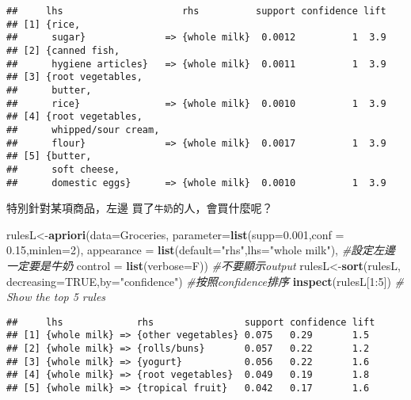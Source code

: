 \documentclass[]{book}
\newenvironment{Shaded}{\begin{snugshade}}{\end{snugshade}}
\newcommand{\KeywordTok}[1]{\textcolor[rgb]{0.13,0.29,0.53}{\textbf{{#1}}}}
\newcommand{\DataTypeTok}[1]{\textcolor[rgb]{0.13,0.29,0.53}{{#1}}}
\newcommand{\DecValTok}[1]{\textcolor[rgb]{0.00,0.00,0.81}{{#1}}}
\newcommand{\FloatTok}[1]{\textcolor[rgb]{0.00,0.00,0.81}{{#1}}}
\newcommand{\StringTok}[1]{\textcolor[rgb]{0.31,0.60,0.02}{{#1}}}
\newcommand{\CommentTok}[1]{\textcolor[rgb]{0.56,0.35,0.01}{\textit{{#1}}}}
\newcommand{\OtherTok}[1]{\textcolor[rgb]{0.56,0.35,0.01}{{#1}}}
\newcommand{\NormalTok}[1]{{#1}}
\begin{document}
\begin{verbatim}
##     lhs                     rhs          support confidence lift
## [1] {rice,                                                      
##      sugar}              => {whole milk}  0.0012          1  3.9
## [2] {canned fish,                                               
##      hygiene articles}   => {whole milk}  0.0011          1  3.9
## [3] {root vegetables,                                           
##      butter,                                                    
##      rice}               => {whole milk}  0.0010          1  3.9
## [4] {root vegetables,                                           
##      whipped/sour cream,                                        
##      flour}              => {whole milk}  0.0017          1  3.9
## [5] {butter,                                                    
##      soft cheese,                                               
##      domestic eggs}      => {whole milk}  0.0010          1  3.9
\end{verbatim}

特別針對某項商品，左邊 買了\texttt{牛奶}的人，會買什麼呢？

\begin{Shaded}
\begin{Highlighting}[]
\NormalTok{rulesL<-}\KeywordTok{apriori}\NormalTok{(}\DataTypeTok{data=}\NormalTok{Groceries, }\DataTypeTok{parameter=}\KeywordTok{list}\NormalTok{(}\DataTypeTok{supp=}\FloatTok{0.001}\NormalTok{,}\DataTypeTok{conf =} \FloatTok{0.15}\NormalTok{,}\DataTypeTok{minlen=}\DecValTok{2}\NormalTok{),}
        \DataTypeTok{appearance =} \KeywordTok{list}\NormalTok{(}\DataTypeTok{default=}\StringTok{"rhs"}\NormalTok{,}\DataTypeTok{lhs=}\StringTok{"whole milk"}\NormalTok{), }\CommentTok{#設定左邊一定要是牛奶}
        \DataTypeTok{control =} \KeywordTok{list}\NormalTok{(}\DataTypeTok{verbose=}\NormalTok{F)) }\CommentTok{#不要顯示output}
\NormalTok{rulesL<-}\KeywordTok{sort}\NormalTok{(rulesL, }\DataTypeTok{decreasing=}\OtherTok{TRUE}\NormalTok{,}\DataTypeTok{by=}\StringTok{"confidence"}\NormalTok{) }\CommentTok{#按照confidence排序}
\KeywordTok{inspect}\NormalTok{(rulesL[}\DecValTok{1}\NormalTok{:}\DecValTok{5}\NormalTok{]) }\CommentTok{# Show the top 5 rules}
\end{Highlighting}
\end{Shaded}

\begin{verbatim}
##     lhs             rhs                support confidence lift
## [1] {whole milk} => {other vegetables} 0.075   0.29       1.5 
## [2] {whole milk} => {rolls/buns}       0.057   0.22       1.2 
## [3] {whole milk} => {yogurt}           0.056   0.22       1.6 
## [4] {whole milk} => {root vegetables}  0.049   0.19       1.8 
## [5] {whole milk} => {tropical fruit}   0.042   0.17       1.6
\end{verbatim}
\end{document}
